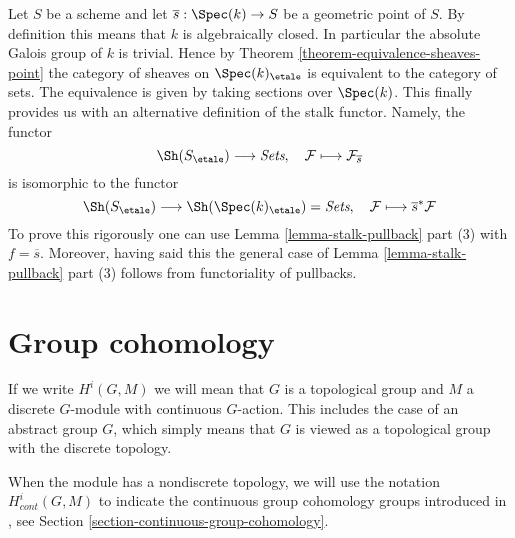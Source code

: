 \begin{remark}
\label{remark-stalk-pullback}
Let $S$ be a scheme and let $\overline{s} : \Spec(k) \to S$
be a geometric point of $S$. By definition this means that $k$
is algebraically closed. In particular the absolute Galois group of $k$
is trivial. Hence by
Theorem \ref{theorem-equivalence-sheaves-point}
the category of sheaves on $\Spec(k)_\etale$ is equivalent
to the category of sets. The equivalence is given by taking
sections over $\Spec(k)$. This finally provides us with an
alternative definition of the stalk functor. Namely, the functor
$$
\Sh(S_\etale) \longrightarrow \textit{Sets}, \quad
\mathcal{F} \longmapsto \mathcal{F}_{\overline{s}}
$$
is isomorphic to the functor
$$
\Sh(S_\etale)
\longrightarrow
\Sh(\Spec(k)_\etale) = \textit{Sets},
\quad
\mathcal{F} \longmapsto \overline{s}^*\mathcal{F}
$$
To prove this rigorously one can use
Lemma \ref{lemma-stalk-pullback} part (3)
with $f = \overline{s}$. Moreover, having said this the general case of
Lemma \ref{lemma-stalk-pullback} part (3)
follows from functoriality of pullbacks.
\end{remark}






\section{Group cohomology}
\label{section-group-cohomology}

\noindent
If we write $H^i(G, M)$ we will mean that $G$ is a topological group
and $M$ a discrete $G$-module with continuous $G$-action. This includes
the case of an abstract group $G$, which simply means that $G$ is viewed
as a topological group with the discrete topology.

\medskip\noindent
When the module has a nondiscrete topology, we will use the notation
$H^i_{cont}(G, M)$ to indicate the continuous group cohomology groups
introduced in \cite{Tate}, see
Section \ref{section-continuous-group-cohomology}.

